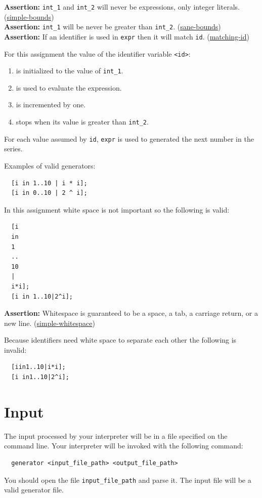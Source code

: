 \documentclass{article}
\newcommand{\code}[1]{\texttt{\textmd{#1}}}
\newcommand{\assertion}[2]{\textbf{Assertion: }#1 (\hyperlink{#2}{#2})}
\begin{document}
\assertion{\code{int\_1} and \code{int\_2} will never be expressions, only integer literals.}
{simple-bounds} \\
\assertion{\code{int\_1} will be never be greater than \code{int\_2}.}{sane-bounds}\\
\assertion{If an identifier is used in \code{expr} then it will match \code{id}.}{matching-id}

For this assignment the value of the identifier variable \code{<id>}:
\begin{enumerate}
  \item is initialized to the value of \code{int\_1}.
  \item is used to evaluate the expression.
  \item is incremented by one.
  \item stops when its value is greater than \code{int\_2}.
\end{enumerate}
For each value assumed by \code{id}, \code{expr} is used to generated the next number in the
series.

Examples of valid generators:
\begin{lstlisting}
  [i in 1..10 | i * i];
  [i in 0..10 | 2 ^ i];
\end{lstlisting}

In this assignment white space is not important so the following is valid:

\begin{lstlisting}
  [i
  in
  1
  ..
  10
  |
  i*i];
  [i in 1..10|2^i];
\end{lstlisting}

\assertion{Whitespace is guaranteed to be a space, a tab, a carriage return, or a new
line.}{simple-whitespace}

Because identifiers need white space to separate each other the following is invalid:
\begin{lstlisting}
  [iin1..10|i*i];
  [i in1..10|2^i];
\end{lstlisting}

\section{Input}
The input processed by your interpreter will be in a file specified on the command line. Your
interpreter will be invoked with the following command:
\begin{lstlisting}
  generator <input_file_path> <output_file_path>
\end{lstlisting}
You should open the file \code{input\_file\_path} and parse it. The input file will be a valid
generator file.
\end{document}
